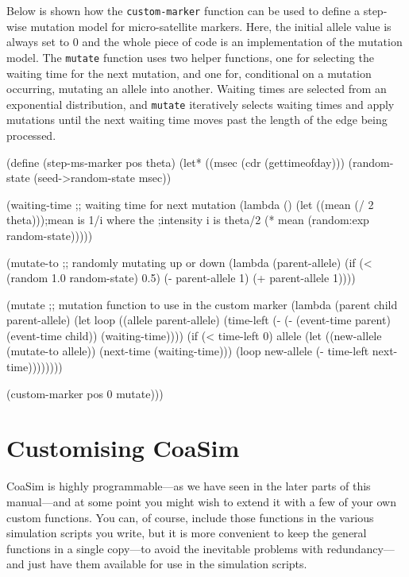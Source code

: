 \documentclass{manual}
\begin{document}
Below is shown how the \texttt{custom-marker} function can be used to
define a step-wise mutation model for micro-satellite markers.  Here,
the initial allele value is always set to 0 and the whole piece of
code is an implementation of the mutation model.  The \texttt{mutate}
function uses two helper functions, one for selecting the waiting time
for the next mutation, and one for, conditional on a mutation
occurring, mutating an allele into another.  Waiting times are
selected from an exponential distribution, and \texttt{mutate}
iteratively selects waiting times and apply mutations until the next
waiting time moves past the length of the edge being processed.

\begin{code}
(define (step-ms-marker pos theta)
  (let* ((msec (cdr (gettimeofday)))
         (random-state (seed->random-state msec))

         (waiting-time
          ;; waiting time for next mutation
          (lambda ()
            (let ((mean (/ 2 theta)));mean is 1/i where the
                                     ;intensity i is theta/2
              (* mean (random:exp random-state)))))

         (mutate-to
          ;; randomly mutating up or down
          (lambda (parent-allele)
            (if (< (random 1.0 random-state) 0.5)
                (- parent-allele 1)
                (+ parent-allele 1))))

         (mutate
          ;; mutation function to use in the custom marker
          (lambda (parent child parent-allele)
            (let loop ((allele parent-allele)
                       (time-left 
                        (- (- (event-time parent) (event-time child))
                           (waiting-time))))
              (if (< time-left 0)
                  allele
                  (let ((new-allele (mutate-to allele))
                        (next-time (waiting-time)))
                    (loop new-allele (- time-left next-time))))))))

    (custom-marker pos 0 mutate)))
\end{code}


\section{Customising CoaSim}
\label{sec:customising-coasim}

CoaSim is highly programmable---as we have seen in the later parts of
this manual---and at some point you might wish to extend it with a few
of your own custom functions.  You can, of course, include those
functions in the various simulation scripts you write, but it is more
convenient to keep the general functions in a single copy---to avoid
the inevitable problems with redundancy---and just have them available
for use in the simulation scripts.
\end{document}
